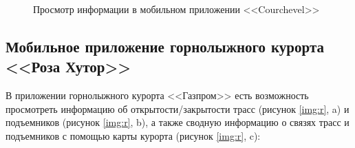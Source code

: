 \begin{figure}[h!]
\begin{center}
	\end{center}
	\captionsetup{justification=centering}
	\caption{Просмотр информации в мобильном приложении <<Courchevel>>}
	\label{img:Courchevel}
\end{figure}


\subsection{Мобильное приложение горнолыжного курорта <<Роза Хутор>>}

В приложении горнолыжного курорта <<Газпром>> есть возможность просмотреть информацию об открытости/закрытости трасс (рисунок \ref{img:r}, a) и подъемников (рисунок \ref{img:r}, b), а также сводную информацию о связях трасс и подъемников с помощью карты курорта (рисунок \ref{img:r}, c):



